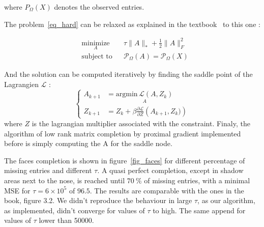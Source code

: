\documentclass[12pt,a4paper,onecolumn]{article}
\begin{document}
where \(P_{\Omega}(X)\) denotes the observed entries.

The problem~\eqref{eq_hard} can be relaxed as explained in the textbook~\cite{vidal2016principal} to this one :

\begin{equation}
	\begin{aligned}
		 & \underset{A}{\text{minimize}}
		 &                               & \tau \lVert A \rVert_* + \frac{1}{2}\lVert A \rVert_F^2 \\
		 & \text{subject to}
		 &                               & \mathcal{P}_{\Omega}(A) = \mathcal{P}_{\Omega}(X)
	\end{aligned}
	\label{eq_hard}
\end{equation}

And the solution can be computed iteratively by finding the saddle point of the Lagrangien \(\mathcal{L}\) :
\begin{equation}
	\left\{
	\begin{split}
		A_{k+1} &= \underset{A}{\text{argmin}\,\mathcal{L}(A, Z_k)}\\
		Z_{k+1} &= Z_k + \beta \frac{\partial\mathcal{L}}{\partial Z}\left(A_{k+1}, Z_k)\right)
	\end{split}
	\label{eq_algo}
	\right.
\end{equation}
where \(Z\) is the lagrangian multiplier associated with the constraint. Finaly, the algorithm of low rank matrix completion by proximal gradient implemented before is simply computing the A for the saddle node.

The faces completion is shown in figure~\ref{fig_faces} for different percentage of missing entries and different \(\tau\). A quasi perfect completion, except in shadow areas next to the nose, is reached until \(70~\%\) of missing entries, with a minimal MSE for \(\tau = 6\times10^5\) of \(96.5\). The results are comparable with the ones in the book, figure 3.2. We didn't reproduce the behaviour in large \(\tau\), as our algorithm, as implemented, didn't converge for values of \(\tau\) to high. The same append for values of \(\tau\) lower than 50000.
\end{document}
